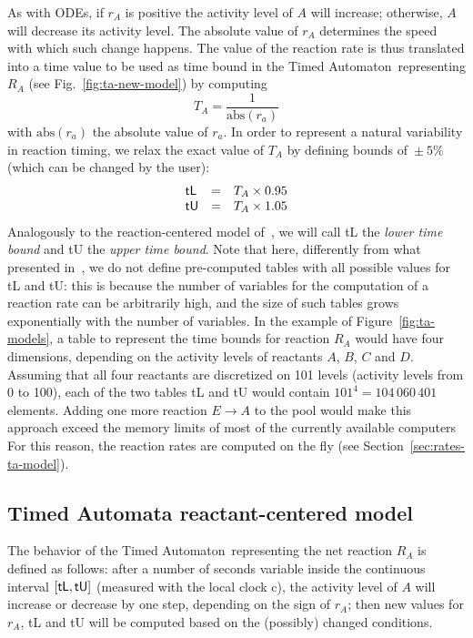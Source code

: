 \documentclass{llncs}
\newcommand{\ta}{Timed Automaton}
\begin{document}
As with ODEs, if $r_A$ is positive the activity level of $A$ will increase;
otherwise, $A$ will decrease its activity level.
The absolute value of $r_A$ determines the speed with which such change happens.
The value of the reaction rate is thus translated into a time value to be used as
time bound in the \ta\ representing $R_A$ (see Fig.~\ref{fig:ta-new-model}) by computing
$$T_A = \frac{1}{\mbox{abs}(r_a)}$$
with $\mbox{abs}(r_a)$ the absolute value of $r_a$. In order to represent
a natural variability in reaction timing, we relax the exact value of $T_A$ by
defining bounds of~$\pm~5\%$ (which can be changed by the user):
$$
\begin{array}{lcl}
  \mbox{\sf tL} &=& T_A \times 0.95 \\
  \mbox{\sf tU} &=& T_A \times 1.05
\end{array}
$$
Analogously to the reaction-centered model of~\cite{animo-ieee},
we will call {\sf tL} the \emph{lower time bound} and {\sf tU} the \emph{upper time bound}.
Note that here, differently from what presented in~\cite{animo-ieee}, we do not define
pre-computed tables with all possible values for {\sf tL} and {\sf tU}: this is because
the number of variables for the computation of a reaction rate can be arbitrarily high, and
the size of such tables grows exponentially with the number of variables.
In the example of Figure~\ref{fig:ta-models}, a table to represent the time bounds
for reaction ${R_A}$ would have four dimensions, depending on the activity levels
of reactants $A$, $B$, $C$ and $D$. Assuming that all four reactants are discretized
on 101 levels (activity levels from 0 to 100), each of the two tables {\sf tL} and {\sf tU} would contain $101^4 = 104\,060\,401$
elements. Adding one more reaction $E \rightarrow A$ to the pool would make
this approach exceed the memory limits of most of the currently available computers
For this reason, the reaction rates are computed on the fly (see Section~\ref{sec:rates-ta-model}).


\subsection{Timed Automata reactant-centered model}\label{sec:ta-model}
The behavior of the \ta\ representing the net reaction $R_A$ is defined as follows: after a number of seconds
variable inside the continuous interval $[\mbox{\sf tL}, \mbox{\sf tU}]$ (measured with the local clock {\sf c}),
the activity level of $A$ will increase or
decrease by one step, depending on the sign of $r_A$; then new values for $r_A$, {\sf tL} and {\sf tU} will be computed based
on the (possibly) changed conditions.
\end{document}
